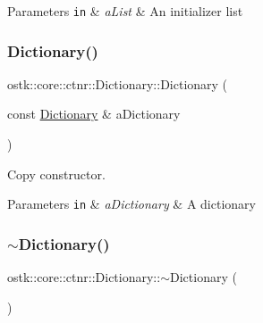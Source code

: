 \begin{DoxyParams}[1]{Parameters}
\mbox{\tt in}  & {\em a\+List} & An initializer list \\
\hline
\end{DoxyParams}
\mbox{\label{classostk_1_1core_1_1ctnr_1_1_dictionary_abc6a558f82366c20d4f26ba9c93730bd}} 
\subsubsection{\texorpdfstring{Dictionary()}{Dictionary()}\hspace{0.1cm}{\footnotesize\ttfamily [2/2]}}
{\footnotesize\ttfamily ostk\+::core\+::ctnr\+::\+Dictionary\+::\+Dictionary (\begin{DoxyParamCaption}\item[{const \hyperlink{classostk_1_1core_1_1ctnr_1_1_dictionary}{Dictionary} \&}]{a\+Dictionary }\end{DoxyParamCaption})}



Copy constructor. 


\begin{DoxyParams}[1]{Parameters}
\mbox{\tt in}  & {\em a\+Dictionary} & A dictionary \\
\hline
\end{DoxyParams}
\mbox{\label{classostk_1_1core_1_1ctnr_1_1_dictionary_a15e605e337e0e0bcdd39dc4843c222d9}} 
\subsubsection{\texorpdfstring{$\sim$\+Dictionary()}{~Dictionary()}}
{\footnotesize\ttfamily ostk\+::core\+::ctnr\+::\+Dictionary\+::$\sim$\+Dictionary (\begin{DoxyParamCaption}{ }\end{DoxyParamCaption})}



